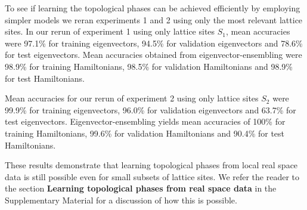 \documentclass[fleqn,10pt]{wlscirep}
\begin{document}
To see if learning the topological phases can be achieved efficiently by employing simpler models we reran experiments 1 and 2 using only the most relevant lattice sites. In our rerun of experiment 1 using only lattice sites $S_1$, mean accuracies were 97.1\% for training eigenvectors, 94.5\% for validation eigenvectors and 78.6\% for test eigenvectors. Mean accuracies obtained from eigenvector-ensembling were 98.9\% for training Hamiltonians, 98.5\% for validation Hamiltonians and 98.9\% for test Hamiltonians.

Mean accuracies for our rerun of experiment 2 using only lattice sites $S_2$ were 99.9\% for training eigenvectors, 96.0\% for validation eigenvectors and 63.7\% for test eigenvectors. Eigenvector-ensembling yields mean accuracies of 100\% for training Hamiltonians, 99.6\% for validation Hamiltonians and 90.4\% for test Hamiltonians.

These results demonstrate that learning topological phases from local real space data is still possible even for small subsets of lattice sites. We refer the reader to the section \textbf{Learning topological phases from real space data} in the Supplementary Material for a discussion of how this is possible.
\end{document}
